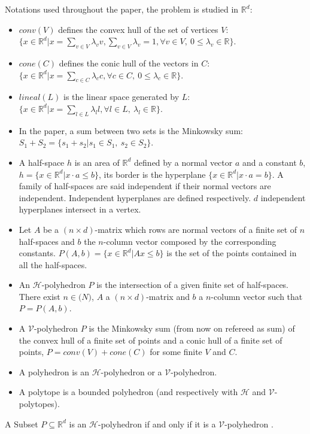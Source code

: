 Notations used throughout the paper, the problem is studied in $\mathbb{R}^d$:
\begin{itemize}
	\item $conv(V)$ defines the convex hull of the set of vertices $V$: $\{ x\in\mathbb{R}^d| x=\sum_{v\in V} \lambda_v v, \sum_{v\in V} \lambda_v =1, \forall v \in V, \ 0\leq \lambda_v \in \mathbb{R} \}$.
	\item $cone(C)$ defines the conic hull of the vectors in $C$: $\{ x\in\mathbb{R}^d| x=\sum_{c\in C} \lambda_c c, \forall c \in C,\ 0\leq \lambda_c \in \mathbb{R} \}$.
	\item $lineal(L)$ is the linear space generated by $L$: $\{ x\in\mathbb{R}^d| x=\sum_{l\in L} \lambda_l l, \forall l \in L,\ \lambda_l \in \mathbb{R} \}$. 
	\item In the paper, a sum between two sets is the Minkowsky sum: $S_1+S_2=\{s_1+s_2|s_1\in S_1,\ s_2 \in S_2 \}$.
	\item A half-space $h$ is an area of $\mathbb{R}^d$ defined by a normal vector $a$ and a constant $b$, $h=\{x\in\mathbb{R}^d|x\cdot a\leq b\}$, its border is the hyperplane $\{x\in\mathbb{R}^d|x\cdot a = b\}$. A family of half-spaces are said independent if their normal vectors are independent. Independent hyperplanes are defined respectively. $d$ independent hyperplanes intersect in a vertex.
	\item Let $A$ be a $(n\times d)$-matrix which rows are normal vectors of a finite set of $n$ half-spaces and $b$ the $n$-column vector composed by the corresponding constants. $P(A,b)=\{x\in\mathbb{R}^d|Ax\leq b\}$ is the set of the points contained in all the half-spaces.
	\item An $\mathcal{H}$-polyhedron $P$ is the intersection of a given finite set of half-spaces. There exist $n\in \mathbb(N)$, $A$ a $(n\times d)$-matrix and $b$ a $n$-column vector such that $P=P(A,b)$.
	\item A $\mathcal{V}$-polyhedron $P$ is the Minkowsky sum (from now on refereed as sum) of the convex hull of a finite set of points and a conic hull of a finite set of points, $P=conv(V)+cone(C)$ for some finite $V$ and $C$.
	\item A polyhedron is an $\mathcal{H}$-polyhedron or a $\mathcal{V}$-polyhedron.
	\item A polytope is a bounded polyhedron (and respectively with $\mathcal{H}$ and $\mathcal{V}$-polytopes).
\end{itemize}
 

\begin{theorem}
A Subset $P\subseteq\mathbb{R}^d$ is an $\mathcal{H}$-polyhedron if and only if it is a $\mathcal{V}$-polyhedron \cite{ziegler_polytopes}.
\label{thm_representation}
\end{theorem} 

